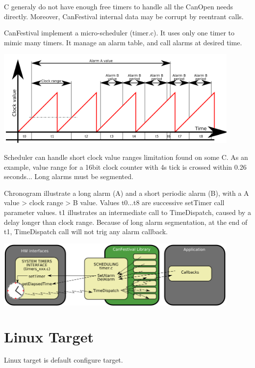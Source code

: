 \documentclass[a4paper,12pt]{book}
\begin{document}
{\textmu}C generaly do not have enough free timers to handle all the
CanOpen needs directly. Moreover, CanFestival internal data may be
corrupt by reentrant calls. 

CanFestival implement a micro{}-scheduler (timer.c). It uses only one
timer to mimic many timers. It manage an alarm table, and call alarms
at desired time.

\begin{center}
   \includegraphics[width=12cm]{Pictures/100000000000022C000000DEDAD2140C.png}
\end{center}

Scheduler can handle short clock value ranges limitation found on some
{\textmu}C. As an example, value range for a 16bit clock counter with
4{\textmu}s tick is crossed within 0.26 seconds... Long alarms must be
segmented.

Chronogram illustrate a long alarm (A) and a short periodic alarm (B),
with a A value {\textgreater} clock range {\textgreater} B value.
Values t0...t8 are successive setTimer call parameter values. t1
illustrates an intermediate call to TimeDispatch, caused by a delay
longer than clock range. Because of long alarm segmentation, at the end
of t1, TimeDispatch call will not trig any alarm callback.

\begin{center}
   \includegraphics[width=12cm]{Pictures/1000000000000396000000FFC42573DA.png}
\end{center}

\section{Linux Target}
Linux target is default configure target.
\end{document}
